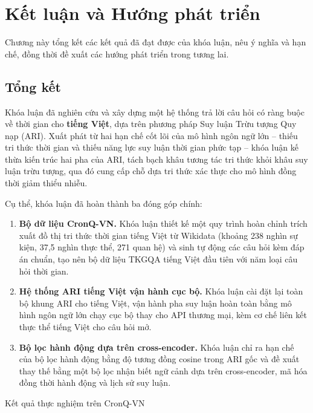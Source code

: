 \chapter{Kết luận và Hướng phát triển}
\label{ch:conclusion}

Chương này tổng kết các kết quả đã đạt được của khóa luận, nêu ý nghĩa và hạn chế, đồng thời đề
xuất các hướng phát triển trong tương lai.

\section{Tổng kết}
\label{sec:summary}

Khóa luận đã nghiên cứu và xây dựng một hệ thống trả lời câu hỏi có ràng buộc về thời gian cho
\textbf{tiếng Việt}, dựa trên phương pháp Suy luận Trừu tượng Quy nạp (ARI). Xuất phát từ hai hạn
chế cốt lõi của mô hình ngôn ngữ lớn -- thiếu tri thức thời gian và thiếu năng lực suy luận thời
gian phức tạp -- khóa luận kế thừa kiến trúc hai pha của ARI, tách bạch khâu tương tác tri thức khỏi
khâu suy luận trừu tượng, qua đó cung cấp chỗ dựa tri thức xác thực cho mô hình đồng thời giảm thiểu
nhiễu.

Cụ thể, khóa luận đã hoàn thành ba đóng góp chính:

\begin{enumerate}
  \item \textbf{Bộ dữ liệu CronQ-VN.} Khóa luận thiết kế một quy trình hoàn chỉnh trích xuất đồ thị
  tri thức thời gian tiếng Việt từ Wikidata (khoảng 238 nghìn sự kiện, 37,5 nghìn thực thể, 271
  quan hệ) và sinh tự động các câu hỏi kèm đáp án chuẩn, tạo nên bộ dữ liệu TKGQA tiếng Việt đầu
  tiên với năm loại câu hỏi thời gian.
  \item \textbf{Hệ thống ARI tiếng Việt vận hành cục bộ.} Khóa luận cài đặt lại toàn bộ khung ARI
  cho tiếng Việt, vận hành pha suy luận hoàn toàn bằng mô hình ngôn ngữ lớn chạy cục bộ thay cho API
  thương mại, kèm cơ chế liên kết thực thể tiếng Việt cho câu hỏi mở.
  \item \textbf{Bộ lọc hành động dựa trên cross-encoder.} Khóa luận chỉ ra hạn chế của bộ lọc hành
  động bằng độ tương đồng cosine trong ARI gốc và đề xuất thay thế bằng một bộ lọc nhận biết ngữ
  cảnh dựa trên cross-encoder, mã hóa đồng thời hành động và lịch sử suy luận.
\end{enumerate}

Kết quả thực nghiệm trên CronQ-VN 

